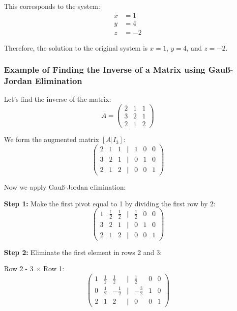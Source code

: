 This corresponds to the system:
\begin{align*}
x &= 1 \\
y &= 4 \\
z &= -2
\end{align*}

Therefore, the solution to the original system is \(x = 1\), \(y = 4\), and \(z = -2\).

\subsubsection{Example of Finding the Inverse of a Matrix using Gauß-Jordan Elimination}

Let's find the inverse of the matrix:
\begin{equation*}
A = 
\begin{pmatrix}
2 & 1 & 1 \\
3 & 2 & 1 \\
2 & 1 & 2
\end{pmatrix}
\end{equation*}

We form the augmented matrix \([A|I_3]\):
\begin{equation*}
\begin{pmatrix}
2 & 1 & 1 & | & 1 & 0 & 0 \\
3 & 2 & 1 & | & 0 & 1 & 0 \\
2 & 1 & 2 & | & 0 & 0 & 1
\end{pmatrix}
\end{equation*}

Now we apply Gauß-Jordan elimination:

\textbf{Step 1:} Make the first pivot equal to 1 by dividing the first row by 2:
\begin{equation*}
\begin{pmatrix}
1 & \frac{1}{2} & \frac{1}{2} & | & \frac{1}{2} & 0 & 0 \\
3 & 2 & 1 & | & 0 & 1 & 0 \\
2 & 1 & 2 & | & 0 & 0 & 1
\end{pmatrix}
\end{equation*}

\textbf{Step 2:} Eliminate the first element in rows 2 and 3:

Row 2 - 3 \(\times\) Row 1:
\begin{equation*}
\begin{pmatrix}
1 & \frac{1}{2} & \frac{1}{2} & | & \frac{1}{2} & 0 & 0 \\
0 & \frac{1}{2} & -\frac{1}{2} & | & -\frac{3}{2} & 1 & 0 \\
2 & 1 & 2 & | & 0 & 0 & 1
\end{pmatrix}
\end{equation*}

